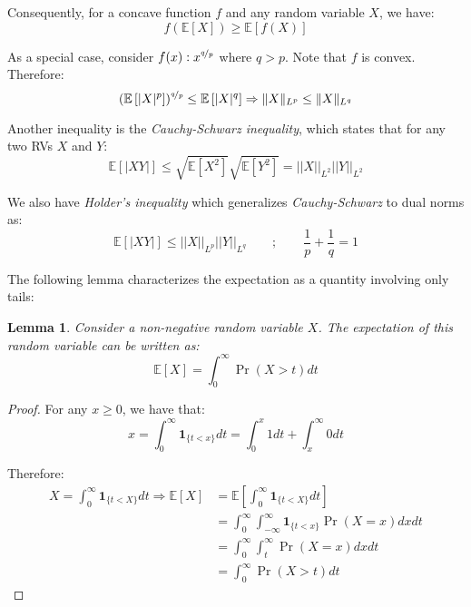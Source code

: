 \documentclass{article}
\newtheorem{lemma}{Lemma}[subsection]
\theoremstyle{remark}
\newcommand{\Exp}{\mathbb{E}}
\newcommand{\indic}[1]{\mathbf{1}_{\{#1\}}}
\begin{document}
Consequently, for a concave function \(f\) and any random variable \(X\), we have:
\begin{equation*}
f(\Exp[X]) \geq \Exp[f(X)]
\end{equation*}

As a special case, consider \(f(x) : x^{\nicefrac{q}{p}}\) where \(q > p\). Note that \(f\) is convex. Therefore:
\begin{equation*}
(\Exp\left[|X|^{p}\right])^{\nicefrac{q}{p}} \leq \Exp\left[|X|^{q}\right] \Rightarrow \|X\|_{L^{p}} \leq \|X\|_{L^{q}}
\end{equation*}

Another inequality is the \emph{Cauchy-Schwarz inequality}, which states that for any two RVs \(X\) and \(Y\):
\begin{equation*}
\Exp[|XY|] \leq \sqrt{\Exp[X^{2}]}\sqrt{\Exp[Y^{2}]} = ||X||_{L^{2}} ||Y||_{L^{2}}
\end{equation*}

We also have \emph{Holder's inequality} which generalizes \emph{Cauchy-Schwarz} to dual norms as:
\begin{equation*}
\Exp[|XY|] \leq ||X||_{L^{p}} ||Y||_{L^{q}} \qquad;\qquad \frac{1}{p} + \frac{1}{q} = 1
\end{equation*}

The following lemma characterizes the expectation as a quantity involving only tails:
\begin{lemma}
\label{lem:tail-expectation}
Consider a non-negative random variable \(X\). The expectation of this random variable can be written as:
\begin{equation*}
\Exp[X] = \int_{0}^{\infty} \Pr(X > t) dt
\end{equation*}
\end{lemma}

\begin{proof}
For any \(x \geq 0\), we have that:
\begin{equation*}
x = \int_{0}^{\infty} \indic{t < x} dt = \int_{0}^{x} 1 dt + \int_{x}^{\infty} 0 dt
\end{equation*}

Therefore:
\begin{align*}
X = \int_{0}^{\infty} \indic{t < X} dt \Rightarrow \Exp[X] &= \Exp\left[\int_{0}^{\infty} \indic{t < X} dt\right] \\
& = \int_{0}^{\infty} \int_{-\infty}^{\infty} \indic{t < x} \Pr(X = x) dx dt \\
& = \int_{0}^{\infty} \int_{t}^{\infty} \Pr(X = x) dx dt \\
& = \int_{0}^{\infty} \Pr(X > t) dt
\end{align*}
\end{proof}
\end{document}
